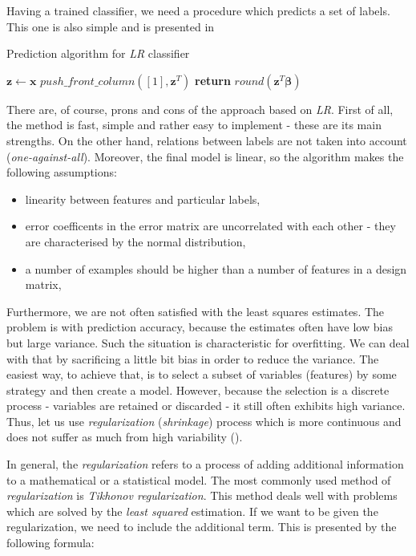 Having a trained classifier, we need a procedure which predicts a set of labels. This one is also simple and is presented in 

\begin{algorithm}
    \caption{Prediction algorithm for \textit{LR} classifier}\label{alg:CL1}
    \begin{algorithmic}[1]
        \State $\boldsymbol{z} \gets \boldsymbol{x}$ 
        \State $push\_front\_column([1], \boldsymbol{z}^T)$ 
        \State \textbf{return} $round(\boldsymbol{z}^T\boldsymbol{\beta})$
    \EndFunction
    \end{algorithmic}
\end{algorithm}

There are, of course, prons and cons of the approach based on \textit{LR}. First of all, the method is fast, simple and rather easy to implement - these are its main strengths. On the other hand, relations between labels are not taken into account (\textit{one-against-all}). Moreover, the final model is linear, so the algorithm makes the following assumptions:

\begin{itemize}
    \item linearity between features and particular labels,
    \item error coefficents in the error matrix are uncorrelated with each other - they are characterised by the normal distribution,
    \item a number of examples should be higher than a number of features in a design matrix,
\end{itemize}

Furthermore, we are not often satisfied with the least squares estimates. The problem is with prediction accuracy, because the estimates often have low bias but large variance. Such the situation is characteristic for overfitting. We can deal with that by sacrificing a little bit bias in order to reduce the variance. The easiest way, to achieve that, is to select a subset of variables (features) by some strategy and then create a model. However, because the selection is a discrete process - variables are retained or discarded - it still often exhibits high variance. Thus, let us use \textit{regularization} (\textit{shrinkage}) process which is more continuous and does not suffer as much from high variability (\cite{Trevor}).

In general, the \textit{regularization} refers to a process of adding additional information to a mathematical or a statistical model. The most commonly used method of \textit{regularization} is \textit{Tikhonov regularization}. This method deals well with problems which are solved by the \textit{least squared} estimation. If we want  to be given the regularization, we need to include the additional term. This is presented by the following formula:

